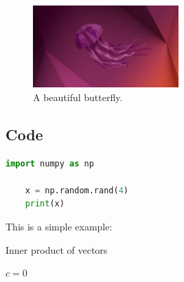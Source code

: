 \documentclass[a4paper, 12pt]{article}
\begin{document}
\begin{figure}[htbp]
    \includegraphics[width = 0.5\textwidth]{1.png}
    \caption{A beautiful butterfly.}

\end{figure}



\subsection{Code}

\begin{lstlisting}[language = python]
    import numpy as np
    
    x = np.random.rand(4)
    print(x)
    \end{lstlisting}
   

    This is a simple example:

    \IncMargin{1em}
    \begin{algorithm}
    \caption{Inner product of vectors}
    $c=0$\;
    \end{algorithm}
\end{document}
